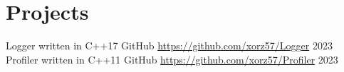 \section{Projects}

\begin{itemize}
    \cventryiv
        {Logger written in C++17}
        {GitHub}
        {\url{https://github.com/xorz57/Logger}}
        {2023}
    \cventryiv
        {Profiler written in C++11}
        {GitHub}
        {\url{https://github.com/xorz57/Profiler}}
        {2023}
\end{itemize}

